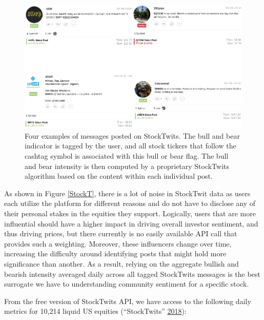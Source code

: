 \documentclass[11,]{article}
\begin{document}
\begin{figure}

{\centering \includegraphics[width=0.8\linewidth]{cahoon_final_paper_files/figure-latex/unnamed-chunk-2-1} 

}

\caption{\label{StockT}Four examples of messages posted on StockTwits. The bull and bear indicator is tagged by the user, and all stock tickers that follow the cashtag symbol is associated with this bull or bear flag. The bull and bear intensity is then computed by a proprietary StockTwits algorithm based on the content within each individual post.}\label{fig:unnamed-chunk-2}
\end{figure}

As shown in Figure \ref{StockT}, there is a lot of noise in StockTwit
data as users each utilize the platform for different reasons and do not
have to disclose any of their personal stakes in the equities they
support. Logically, users that are more influential should have a higher
impact in driving overall investor sentiment, and thus driving prices,
but there currently is no easily available API call that provides such a
weighting. Moreover, these influencers change over time, increasing the
difficulty around identifying posts that might hold more significance
than another. As a result, relying on the aggregate bullish and bearish
intensity averaged daily across all tagged StockTwits messages is the
best surrogate we have to understanding community sentiment for a
specific stock.

From the free version of StockTwits API, we have access to the following
daily metrics for 10,214 liquid US equities (``StockTwits''
\protect\hyperlink{ref-st}{2018}):
\end{document}
